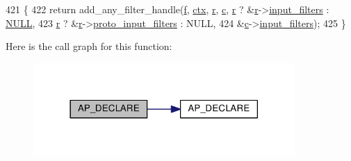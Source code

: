 \begin{DoxyCode}
421 \{
422     \textcolor{keywordflow}{return} add\_any\_filter\_handle(\hyperlink{group__APACHE__CORE__DAEMON_ga588c778c1c1509e472f22dc36efb005e}{f}, \hyperlink{group__APACHE__CORE__FILTER_ga94af791485570bea922969fef12d6259}{ctx}, \hyperlink{group__APACHE__CORE__CONFIG_ga091cdd45984e865a888a4f8bb8fe107a}{r}, \hyperlink{group__APACHE__CORE__HTTPD_ga7cce37ef8558e46f408cb4d0f555605b}{c}, \hyperlink{group__APACHE__CORE__CONFIG_ga091cdd45984e865a888a4f8bb8fe107a}{r} ? &\hyperlink{group__APACHE__CORE__CONFIG_ga091cdd45984e865a888a4f8bb8fe107a}{r}->\hyperlink{structrequest__rec_ab07868ed8240b6236a51aa1e7b198d3e}{input\_filters} : 
      \hyperlink{pcre_8txt_ad7f989d16aa8ca809a36bc392c07fba1}{NULL},
423                                  \hyperlink{group__APACHE__CORE__CONFIG_ga091cdd45984e865a888a4f8bb8fe107a}{r} ? &\hyperlink{group__APACHE__CORE__CONFIG_ga091cdd45984e865a888a4f8bb8fe107a}{r}->\hyperlink{structrequest__rec_af1d131cbf9a8564874b4196bff89121c}{proto\_input\_filters} : NULL,
424                                  &\hyperlink{group__APACHE__CORE__HTTPD_ga7cce37ef8558e46f408cb4d0f555605b}{c}->\hyperlink{structconn__rec_a27bcfa99aac415734fedbb540ab7a3e7}{input\_filters});
425 \}
\end{DoxyCode}


Here is the call graph for this function\+:
\nopagebreak
\begin{figure}[H]
\begin{center}
\leavevmode
\includegraphics[width=282pt]{group__APACHE__CORE__FILTER_ga67fb16c1dc6ea7e40ea2649001d60e57_cgraph}
\end{center}
\end{figure}


